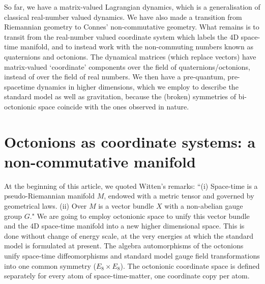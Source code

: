 \documentclass[a4paper]{jpconf}
\begin{document}
So far, we have a matrix-valued Lagrangian dynamics, which is a generalisation of classical 
real-number valued dynamics. We have also made a transition from Riemannian geometry to Connes' non-commutative geometry. What remains is to transit from the real-number valued coordinate system which labels the 4D space-time manifold, and to instead work with the non-commuting numbers known as quaternions and octonions. The dynamical matrices (which replace vectors) have matrix-valued `coordinate' components over the field of quaternions/octonions, instead of over the field of real numbers. We then have a pre-quantum, pre-spacetime dynamics in higher dimensions, which we employ to describe the standard model as well as gravitation, because the (broken) symmetries of 
bi-octonionic space coincide with the ones observed in nature.

\section{Octonions as coordinate systems: a non-commutative manifold}
 At the beginning of this article, we quoted Witten's remarks: ``(i) Space-time is a pseudo-Riemannian manifold $M$, endowed with a metric tensor and governed by geometrical laws. (ii) Over $M$ is a vector bundle $X$ with a non-abelian gauge group $G$." We are going to employ octonionic space to unify this vector bundle and the 4D space-time manifold into a new higher dimensional space. This is done without change of energy scale, at the very energies at which the standard model is formulated at present. The algebra automorphisms of the octonions unify space-time diffeomorphisms and standard model gauge field transformations into one common symmetry ($E_8 \times E_8$). The octonionic coordinate space is defined separately for every atom of space-time-matter, one coordinate copy per atom.
 
\end{document}
